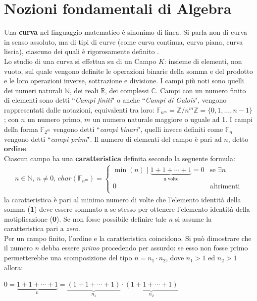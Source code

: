 \documentclass[a4paper,12pt]{tesiinfo}
\begin{document}
\chapter{Nozioni fondamentali di Algebra}
Una \textbf{curva} nel linguaggio matematico \`e sinonimo di linea. Si parla non di curva in senso assoluto, ma di tipi di curve (come curva continua, curva piana, curva liscia), ciascuno dei quali \`e rigorosamente definito \cite{curva3c}.
\\
Lo studio di una curva si effettua su di un Campo $K$: insieme di elementi, non vuoto, sul quale vengono definite le operazioni binarie della somma e del prodotto e le loro operazioni inverse, sottrazione e divisione. I campi pi\`u noti sono quelli dei numeri naturali $\mathbb{N}$, dei reali $\mathbb{R}$, dei complessi $\mathbb{C}$. Campi con un numero finito di elementi sono detti ``\textit{Campi finiti}" o anche ``\textit{Campi di Galois}", vengono rappresentati dalle notazioni, equivalenti tra loro:  $\mathbb{F}_{n^m} = \mathbb{Z}/{n^m}\mathbb{Z} = \{0, 1, \ldots, n-1\}$; con $n$ un numero primo, $m$ un numero naturale maggiore o uguale ad 1. I campi della forma $\mathbb{F}_{2^m}$ vengono detti ``\textit{campi binari}", quelli invece definiti come $\mathbb{F}_{n}$ vengono detti ``\textit{campi primi}". Il numero di elementi del campo \`e pari ad $n$, detto \textbf{ordine}.
\\
Ciascun campo ha una \textbf{caratteristica} definita secondo la seguente formula:
\begin{gather}
n \in \mathbb{N}\text{, }n \ne 0 \text{, }char(\mathbb{F}_{n^m}) = \begin{cases} \min (n) \mid \underbrace{1+1+\cdots+1}_\text{n volte} = 0 & \mbox{se }\exists n\\
0 & \mbox{altrimenti}\\
\end{cases}
\label{charField}
\end{gather}
la caratteristica \`e pari al minimo numero di volte che l'elemento identit\`a della somma (\textbf{1}) deve essere sommato a se stesso per ottenere l'elemento identit\`a della motiplicazione (\textbf{0}). Se non fosse possibile definire tale $n$ si assume la caratteristica pari a \textit{zero}. 
\\
Per un campo finito, l'ordine e la caratteristica coincidono. Si pu\`o dimostrare che il numero $n$ debba essere \textit{primo} procedendo per assurdo: se esso non fosse primo permetterebbe una scomposizione del tipo $n=n_1 \cdot n_2$, dove $n_1>1$ ed $n_2>1$ allora:
\begin{center}
 $0=\underbrace{1+1+\cdots+1}_\text{n} = \underbrace{(1+1+\cdots+1)}_{n_1} \cdot \underbrace{(1+1+\cdots+1)}_{n_2}$
\end{center}
\end{document}
